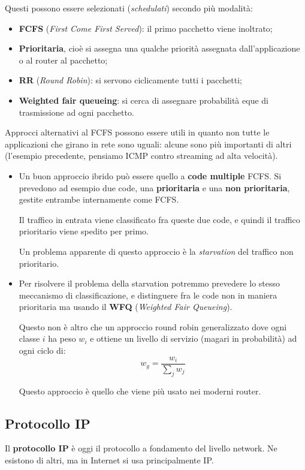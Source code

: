\documentclass[a4paper,11pt]{article}
\begin{document}
Questi possono essere selezionati (\textit{schedulati}) secondo più modalità:
\begin{itemize}
	\item \textbf{FCFS} (\textit{First Come First Served}): il primo pacchetto viene inoltrato;
	\item \textbf{Prioritaria}, cioè si assegna una qualche priorità assegnata dall'applicazione o al router al pacchetto;
	\item \textbf{RR} (\textit{Round Robin}): si servono ciclicamente tutti i pacchetti;
	\item \textbf{Weighted fair queueing}: si cerca di assegnare probabilità eque di trasmissione ad ogni pacchetto.
\end{itemize}

Approcci alternativi al FCFS possono essere utili in quanto non tutte le applicazioni che girano in rete sono uguali: alcune sono più importanti di altri (l'esempio precedente, pensiamo ICMP contro streaming ad alta velocità).

\begin{itemize}
	\item 
		Un buon approccio ibrido può essere quello a \textbf{code multiple} FCFS.
Si prevedono ad esempio due code, una \textbf{prioritaria} e una \textbf{non prioritaria}, gestite entrambe internamente come FCFS.

Il traffico in entrata viene classificato fra queste due code, e quindi il traffico prioritario viene spedito per primo.

Un problema apparente di questo approccio è la \textit{starvation} del traffico non prioritario.

	\item 
Per risolvere il problema della starvation potremmo prevedere lo stesso meccanismo di classificazione, e distinguere fra le code non in maniera prioritaria ma usando il \textbf{WFQ} (\textit{Weighted Fair Queueing}).

Questo non è altro che un approccio round robin generalizzato dove ogni classe $i$ ha peso $w_i$ e ottiene un livello di servizio (magari in probabilità) ad ogni ciclo di:
$$
w_g = \frac{w_i}{\sum_j w_j}
$$

Questo approccio è quello che viene più usato nei moderni router.

\end{itemize}

\subsection{Protocollo IP}
Il \textbf{protocollo IP} è oggi il protocollo a fondamento del livello network. Ne esistono di altri, ma in Internet si usa principalmente IP.
\end{document}
